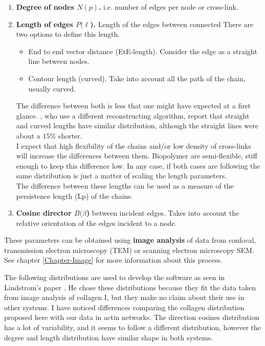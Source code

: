 \begin{enumerate} 
\item \textbf{Degree of nodes $N(p)$.} i.e. number of edges per node
or cross-link.
\item \textbf{Length of edges $P(\ell$).} Length of the edges
between connected
There are two options to define this length.
\begin{itemize}
\item End to end vector distance (EtE-length). Consider the edge as a straight
line between nodes.

\item Contour length (curved). Take into account all the path of the chain,
usually curved.
\end{itemize}

The difference between both is less that one
might have expected at a first glance. \citet{nisslert_identification_2007},
who use a different reconstructing algorithm, report that straight and curved
lengths have similar distribution, although the straight lines were about a
$15\%$ shorter.\\
I expect that high flexibility of the chains and/or low density of cross-links
will increase the differences between them. Biopolymer are semi-flexible, stiff
enough to keep this difference low.
In any case, if both cases are following the same distribution is just a matter
of scaling the length parameters.\\ 
The difference between these lengths can be used as a measure of the
persistence length (\gls{Lp}) of the chains.
  

\item \textbf{Cosine director $B(\beta$)} between incident edges. Takes into
account the relative orientation of the edges incident to a node.


\end{enumerate}

These parameters can be obtained using \textbf{image analysis} of data from
\gls{confocal}, transmission electron microscopy (\gls{TEM}) or
scanning electron microscopy \gls{SEM}. See chapter \ref{Chapter-Image} for
more information about this process.

The following distributions are used to develop the software as seen in
Lindstrom's paper \citep{lindstrom_biopolymer_2010}. He chose these
distributions because they fit the data taken from image analysis of collagen I, but they make
no claim about their use in other systems. I have noticed differences comparing
 the collagen distribution proposed here with our data in actin networks. The
 direction cosines distribution has a lot of variability, and it seems to
 follow a different distribution, however the degree and length distribution
 have similar shape in both systems.


